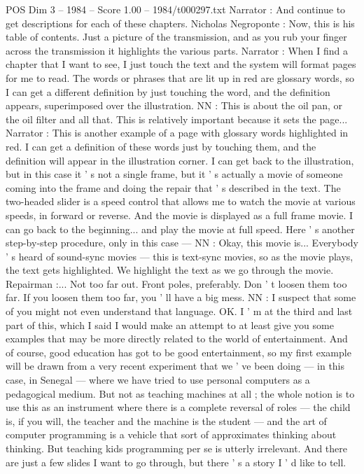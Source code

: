 \begin{textsample}{POS Dim 3 – 1984 – Score 1.00 – 1984/t000297.txt}
Narrator : And continue to get descriptions for each of these chapters.
Nicholas Negroponte : Now, this is his table of contents.
Just a picture of the transmission, and as you rub your finger across the transmission it highlights the various parts.
Narrator : When I find a chapter that I want to see, I just touch the text and the system will format pages for me to read.
The words or phrases that are lit up in red are glossary words, so I can get a different definition by just touching the word, and the definition appears, superimposed over the illustration.
NN : This is about the oil pan, or the oil filter and all that.
This is relatively important because it sets the page...
Narrator : This is another example of a page with glossary words highlighted in red.
I can get a definition of these words just by touching them, and the definition will appear in the illustration corner.
I can get back to the illustration, but in this case it ' s not a single frame, but it ' s actually a movie of someone coming into the frame and doing the repair that ' s described in the text.
The two-headed slider is a speed control that allows me to watch the movie at various speeds, in forward or reverse.
And the movie is displayed as a full frame movie.
I can go back to the beginning... and play the movie at full speed.
Here ' s another step-by-step procedure, only in this case — NN : Okay, this movie is...
Everybody ' s heard of sound-sync movies — this is text-sync movies, so as the movie plays, the text gets highlighted.
We highlight the text as we go through the movie.
Repairman :...
Not too far out.
Front poles, preferably.
Don ' t loosen them too far.
If you loosen them too far, you ' ll have a big mess.
NN : I suspect that some of you might not even understand that language.
OK.
I ' m at the third and last part of this, which I said I would make an attempt to at least give you some examples that may be more directly related to the world of entertainment.
And of course, good education has got to be good entertainment, so my first example will be drawn from a very recent experiment that we ' ve been doing — in this case, in Senegal — where we have tried to use personal computers as a pedagogical medium.
But not as teaching machines at all ; the whole notion is to use this as an instrument where there is a complete reversal of roles — the child is, if you will, the teacher and the machine is the student — and the art of computer programming is a vehicle that sort of approximates thinking about thinking.
But teaching kids programming per se is utterly irrelevant.
And there are just a few slides I want to go through, but there ' s a story I ' d like to tell.

\end{textsample}

